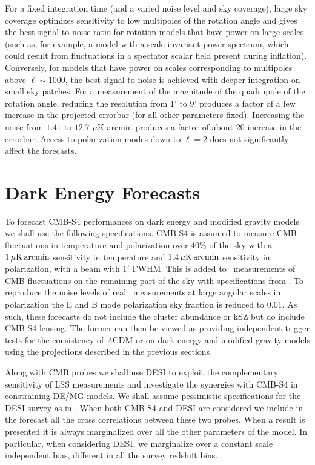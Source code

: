 For a fixed integration time (and a varied noise level and sky coverage), large sky coverage optimizes sensitivity to low multipoles of the rotation angle and gives the best signal-to-noise ratio for rotation models that have power on large scales (such as, for example, a model with a scale-invariant power spectrum, which could result from fluctuations in a spectator scalar field present during inflation). Conversely, for models that have power on scales corresponding to multipoles above $\ell\sim 1000$, the best signal-to-noise is achieved with deeper integration on small sky patches.  For a measurement of the magnitude of the quadrupole of the rotation angle, reducing the resolution from 1' to 9' produces a factor of a few increase in the projected errorbar (for all other parameters fixed). Increasing the noise from $1.41$ to $12.7$ $\mu$K-arcmin produces a factor of about $20$ increase in the errorbar. Access to polarization modes down to $\ell=2$ does not significantly affect the forecasts. 


%

%
\section{Dark Energy Forecasts}
%
\label{sec:deforecasts}

To forecast CMB-S4 performances on dark energy and modified gravity models we shall use the following specifications.
CMB-S4 is assumed to measure CMB fluctuations in temperature and polarization over $40 \%$ of the sky with a $1\,\mu {\rm K} \, {\rm arcmin}$ sensitivity in temperature and $1.4\,\mu {\rm K} \, {\rm arcmin}$ sensitivity in polarization, with a beam with $1'$ FWHM. This is added to \planck\ measurements of CMB fluctuations on the remaining part of the sky with specifications from \cite{Adam:2015rua}. To reproduce the noise levels of real \planck\ measurements at large angular scales in polarization the E and B mode polarization sky fraction is reduced to $0.01$.
 As such, 
these forecasts do not include the cluster abundance or kSZ but do include CMB-S4 lensing.  The former
can then be viewed as providing independent trigger tests for the consistency of $\Lambda$CDM or    on dark energy and modified gravity models 
using the projections described in the previous sections.


Along with CMB probes we shall use DESI to exploit the complementary sensitivity of LSS measurements and investigate the synergies with CMB-S4 in constraining DE/MG models.
We shall assume pessimistic specifications for the DESI survey as in \cite{Font-Ribera:2013rwa}.
When both CMB-S4 and DESI are considered we include in the forecast all the cross correlations between these two probes. 
When a result is presented it is always marginalized over all the other parameters of the model. 
In particular, when considering DESI, we marginalize over a constant scale independent bias, different in all the survey redshift bins.
%

